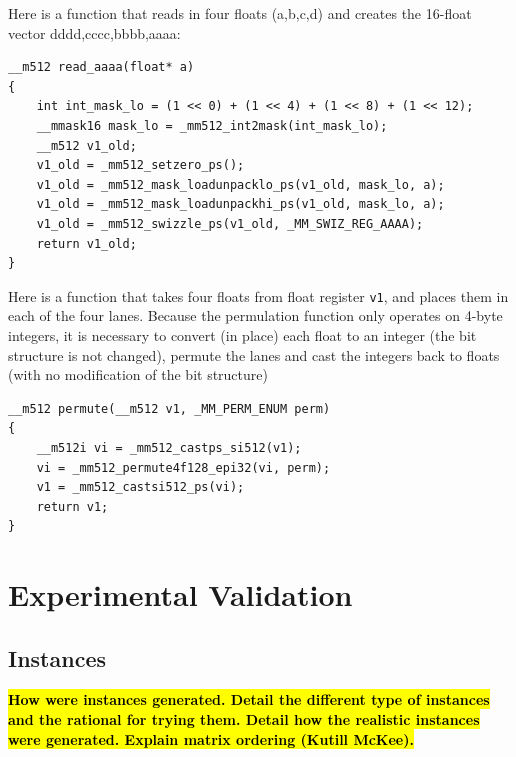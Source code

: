 \documentclass[10pt,conference,compsocconf]{IEEEtran}
\def\ttt#1{{\tt #1}}
\newcommand{\todo}[1]{{\color{red}\textbf{\hl{#1}}\xspace}}
\begin{document}
Here is a function that reads in four floats (a,b,c,d) and creates the 16-float vector dddd,cccc,bbbb,aaaa: 
\begin{verbatim}
__m512 read_aaaa(float* a)                                                              
{
    int int_mask_lo = (1 << 0) + (1 << 4) + (1 << 8) + (1 << 12);
    __mmask16 mask_lo = _mm512_int2mask(int_mask_lo);
    __m512 v1_old;
    v1_old = _mm512_setzero_ps();
    v1_old = _mm512_mask_loadunpacklo_ps(v1_old, mask_lo, a);
    v1_old = _mm512_mask_loadunpackhi_ps(v1_old, mask_lo, a);
    v1_old = _mm512_swizzle_ps(v1_old, _MM_SWIZ_REG_AAAA);
    return v1_old;
}
\end{verbatim}

Here is a function that takes four floats from float register \ttt{v1}, and 
places them in each of the four lanes. Because the permulation function only 
operates on 4-byte integers, it is necessary to convert (in place) each float
to an integer (the bit structure is not changed), permute the lanes and cast
the integers back to floats (with no modification of the bit structure)
\begin{verbatim}
__m512 permute(__m512 v1, _MM_PERM_ENUM perm)                                           
{
    __m512i vi = _mm512_castps_si512(v1);
    vi = _mm512_permute4f128_epi32(vi, perm);
    v1 = _mm512_castsi512_ps(vi);
    return v1;
}
\end{verbatim}







\section{Experimental Validation}
\label{sec:expe}

\subsection{Instances}

\todo{How were instances generated. Detail the different type of
  instances and the rational for trying them. Detail how the realistic
  instances were generated. Explain matrix ordering (Kutill McKee).}
\end{document}
